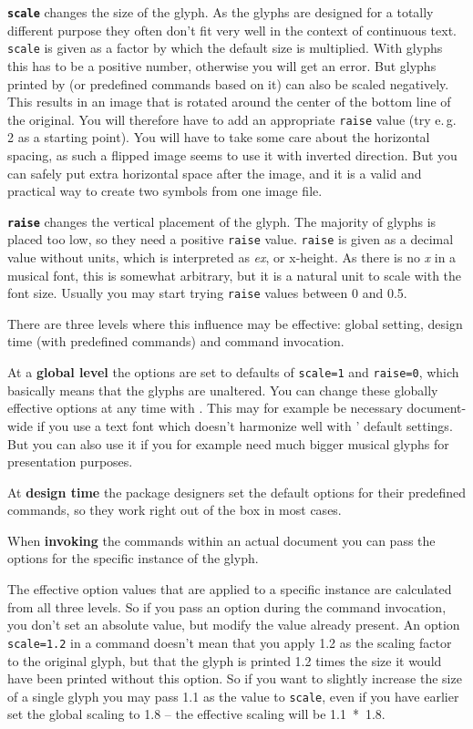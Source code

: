 \documentclass{article}
\begin{document}
\medskip
\texttt{\textbf{scale}} changes the size of the glyph. 
As the \emmentaler glyphs are designed for a totally different purpose they often don't fit very well in the context of continuous text.
\texttt{scale} is given as a factor by which the default size is multiplied.
With \emmentaler glyphs this has to be a positive number, otherwise you will get an error.
But glyphs printed by  (or predefined commands based on it) can also be scaled negatively.
This results in an image that is rotated around the center of the bottom line of the original.
You will therefore have to add an appropriate \texttt{raise} value (try e.\,g. 2 as a starting point).
You will have to take some care about the horizontal spacing, as such a flipped image seems to use it with inverted direction.
But you can safely put extra horizontal space after the image, and it is a valid and practical way to create two symbols from one image file.


\medskip
\texttt{\textbf{raise}} changes the vertical placement of the glyph.
The majority of glyphs is placed too low, so they need a positive \texttt{raise} value.
\texttt{raise} is given as a decimal value without units, which is interpreted as \emph{ex}, or x-height. 
As there is no \emph{x} in a musical font, this is somewhat arbitrary, but it is a natural unit to scale with the font size.
Usually you may start trying \texttt{raise} values between 0 and 0.5.

\medskip
There are three levels where this influence may be effective: global setting, design time (with predefined commands) and command invocation.

At a \textbf{global level} the options are set to defaults of \texttt{scale=1} and \texttt{raise=0}, which basically means that the glyphs are unaltered.
You can change these globally effective options at any time with .
This may for example be necessary document-wide if you use a text font which doesn't harmonize well with \lilyglyphs*' default settings.
But you can also use it if you for example need much bigger musical glyphs for presentation purposes.

At \textbf{design time} the package designers set the default options for their predefined commands, so they work right out of the box in most cases.

When \textbf{invoking} the commands within an actual document you can pass the options for the specific instance of the glyph.

The effective option values that are applied to a specific instance are calculated from all three levels. 
So if you pass an option during the command invocation, you don't set an absolute value, but modify the value already present. 
An option \texttt{scale=1.2} in a command doesn't mean that you apply 1.2 as the scaling factor to the original glyph, but that the glyph is printed 1.2 times the size it would have been printed without this option.
So if you want to slightly increase the size of a single glyph you may pass 1.1 as the value to \texttt{scale}, even if you have earlier set the global scaling to 1.8 -- the effective scaling will be \mbox{1.1 * 1.8.}
\end{document}
